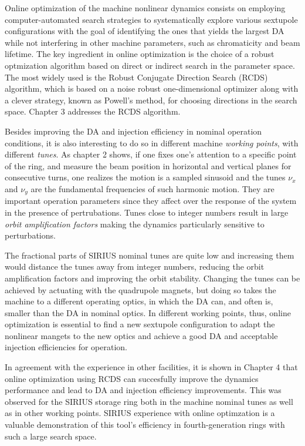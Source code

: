 Online optimization of the machine nonlinear dynamics consists on employing computer-automated search strategies to systematically explore various sextupole configurations with the goal of identifying the ones that yields the largest DA while not interfering in other machine parameters, such as chromaticity and beam lifetime. The key ingredient in online optimization is the choice of a robust optmization algorithm based on direct or indirect search in the parameter space. The most widely used is the Robust Conjugate Direction Search (RCDS) algorithm, which is based on a noise robust one-dimensional optimizer along with a clever strategy, known as Powell's method, for choosing directions in the search space. Chapter 3 addresses the RCDS algorithm.

Besides improving the DA and injection efficiency in nominal operation conditions, it is also interesting to do so in different machine \textit{working points}, with different \textit{tunes}. As chapter 2 shows, if one fixes one's attention to a specific point of the ring, and measure the beam position in horizontal and vertical planes for consecutive turns, one realizes the motion is a sampled sinusoid and the tunes $\nu_x$ and $\nu_y$ are the fundamental frequencies of such harmonic motion. They are important operation parameters  since they affect over the response of the system in the presence of pertrubations. Tunes close to integer numbers result in large \textit{orbit amplification factors} making the dynamics particularly sensitive to perturbations.

The fractional parts of SIRIUS nominal tunes are quite low and increasing them would distance the tunes away from integer numbers, reducing the orbit amplification factors and improving the orbit stability. Changing the tunes can be achieved by actuating with the quadrupole magnets, but doing so takes the machine to a different operating optics, in which the DA can, and often is, smaller than the DA in nominal optics. In different working points, thus, online optimization is essential to find a new sextupole configuration to adapt the nonlinear mangets to the new optics and  achieve a good DA and acceptable injection efficiencies for operation.

In agreement with the experience in other facilities, it is shown in Chapter 4 that online optimization using RCDS can succesfully improve the dynamics performance and lead to DA and injection efficiency improvements. This was observed for the SIRIUS storage ring both in the machine nominal tunes as well as in other working points.  SIRIUS experience with online optimzation is a valuable demonstration of this tool's efficiency in fourth-generation rings with such a large search space.

